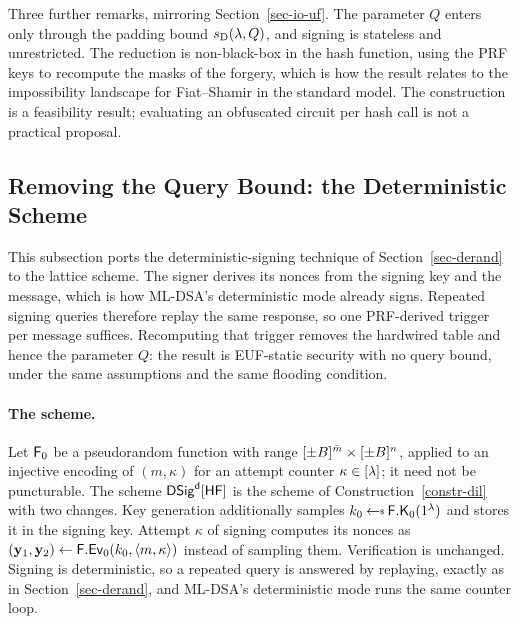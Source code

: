 Three further remarks, mirroring Section~\ref{sec-io-uf}. The parameter $Q$ enters only through the padding bound $s_{\mathrm{D}}(\lambda, Q)$, and signing is stateless and unrestricted. The reduction is non-black-box in the hash function, using the PRF keys to recompute the masks of the forgery, which is how the result relates to the impossibility landscape for Fiat--Shamir in the standard model. The construction is a feasibility result; evaluating an obfuscated circuit per hash call is not a practical proposal.

\subsection{Removing the Query Bound: the Deterministic Scheme} \label{sec-dil-derand}


This subsection ports the deterministic-signing technique of Section~\ref{sec-derand} to the lattice scheme. The signer derives its nonces from the signing key and the message, which is how ML-DSA's deterministic mode already signs. Repeated signing queries therefore replay the same response, so one PRF-derived trigger per message suffices. Recomputing that trigger removes the hardwired table and hence the parameter $Q$: the result is EUF-static security with no query bound, under the same assumptions and the same flooding condition.

\paragraph*{The scheme.} Let $\mathsf{F}_0$ be a pseudorandom function with range $[\pm B]^{\bar m} \times [\pm B]^{n}$, applied to an injective encoding of $(m, \kappa)$ for an attempt counter $\kappa \in [\lambda]$; it need not be puncturable. The scheme $\mathsf{DSig}^{\mathsf{d}}[\mathsf{HF}]$ is the scheme of Construction~\ref{constr-dil} with two changes. Key generation additionally samples $k_0 \getsr \PRFKg_0(\usecp)$ and stores it in the signing key. Attempt $\kappa$ of signing computes its nonces as $(\mathbf{y}_1, \mathbf{y}_2) \gets \mathsf{F}.\mathsf{Ev}_0(k_0, \langle m,\kappa \rangle)$ instead of sampling them. Verification is unchanged. Signing is deterministic, so a repeated query is answered by replaying, exactly as in Section~\ref{sec-derand}, and ML-DSA's deterministic mode runs the same counter loop.


